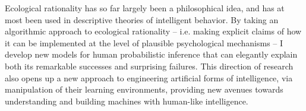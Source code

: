 Ecological rationality has so far largely been a philosophical idea, and has at most been used in descriptive theories of intelligent behavior. By taking an algorithmic approach to ecological rationality -- i.e. making explicit claims of how it can be implemented at the level of plausible psychological mechanisms -- I develop new models for human probabilistic inference that can elegantly explain both its remarkable successes and surprising failures. This direction of research also opens up a new approach to engineering artificial forms of intelligence, via manipulation of their learning environments, providing new avenues towards understanding and building machines with human-like intelligence.
